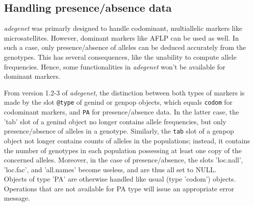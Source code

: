 \documentclass{article}
\begin{document}
\subsection{Handling presence/absence data}
\textit{adegenet} was primarly designed to handle codominant, multiallelic markers like microsatellites.
However, dominant markers like AFLP can be used as well.
In such a case, only presence/absence of alleles can be deduced accurately from
the genotypes.
This has several consequences, like the unability to compute allele frequencies.
Hence, some functionalities in \textit{adegenet} won't be available for
dominant markers.

From version 1.2-3 of \textit{adegenet}, the distinction between both types of markers is made by the slot
\texttt{@type} of genind or genpop objects, which equals \texttt{codom} for
codominant markers, and \texttt{PA} for presence/absence data.
In the latter case, the 'tab' slot of a genind object no longer contains allele
frequencies, but only presence/absence of alleles in a genotype.
Similarly, the \texttt{tab} slot of a genpop object not longer contains
counts of alleles in the populations; instead, it contains the number
of genotypes in each population possessing at least one copy of the concerned alleles.
Moreover, in the case of presence/absence, the slots 'loc.nall', 'loc.fac', and 'all.names'
become useless, and are thus all set to NULL.
\\


Objects of type 'PA' are otherwise handled like usual (type 'codom')
objects.
Operations that are not available for PA type will issue an appropriate error message.
\end{document}
